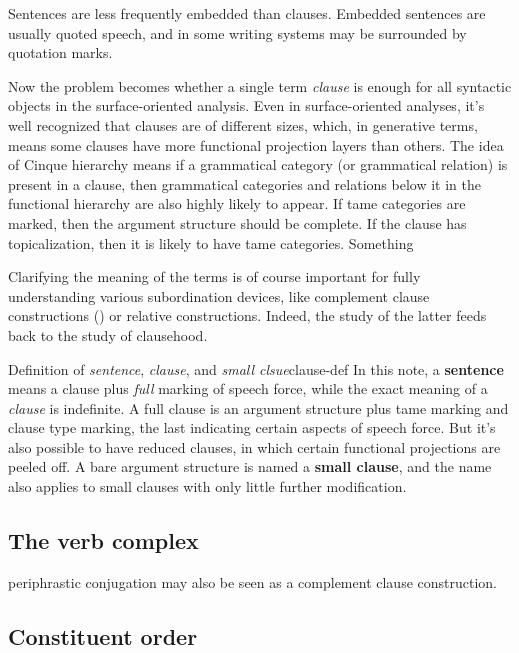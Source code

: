 \documentclass[UTF8, a4paper, oneside, scheme=plain]{ctexart}
\newcommand*{\concept}[1]{\textbf{#1}}
\newcommand*{\term}[1]{\emph{#1}}
\begin{document}
Sentences are less frequently embedded than clauses.
Embedded sentences are usually quoted speech,
and in some writing systems may be surrounded by quotation marks.

Now the problem becomes whether a single term \term{clause} is enough 
for all syntactic objects in the surface-oriented analysis.
Even in surface-oriented analyses,
it's well recognized that clauses are of different sizes,
which, in generative terms, 
means some clauses have more functional projection layers than others.
The idea of Cinque hierarchy means if a grammatical category (or grammatical relation)
is present in a clause,
then grammatical categories and relations below it in the functional hierarchy 
are also highly likely to appear.
If \ac{tame} categories are marked,
then the argument structure should be complete.
If the clause has topicalization,
then it is likely to have \ac{tame} categories.
Something 

Clarifying the meaning of the terms is of course important for fully understanding various subordination devices,
like complement clause constructions () 
or relative constructions.
Indeed, the study of the latter feeds back to the study of clausehood.

\begin{infobox}{Definition of \term{sentence}, \term{clause}, and \term{small clsue}}{clause-def}
    In this note, a \concept{sentence} means a clause plus \emph{full} marking of speech force,
    while the exact meaning of a \term{clause} is indefinite.
    A full clause is an argument structure plus \ac{tame} marking and clause type marking,
    the last indicating certain aspects of speech force.
    But it's also possible to have reduced clauses,
    in which certain functional projections are peeled off.
    A bare argument structure is named a \concept{small clause},
    and the name also applies to small clauses with only little further modification.
\end{infobox}

\subsection{The verb complex}

periphrastic conjugation may also be seen as a complement clause construction. %

\subsection{Constituent order}
\end{document}
